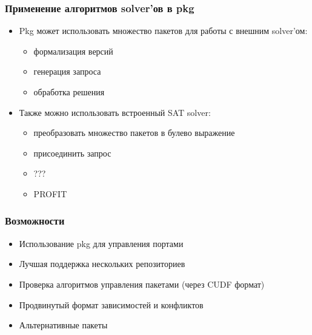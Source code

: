 \documentclass{beamer}
\begin{document}
\begin{frame}
\frametitle{Применение алгоритмов solver'ов в pkg}
\begin{itemize}
  \item Pkg может использовать множество пакетов для работы с внешним solver'ом:
  \begin{itemize}
    \item формализация версий
    \item генерация запроса
    \item обработка решения
  \end{itemize}
  \item Также можно использовать встроенный SAT solver:
  \begin{itemize}
    \item преобразовать множество пакетов в булево выражение
    \item присоединить запрос
    \item ???
    \item PROFIT
  \end{itemize} 
\end{itemize}
\end{frame}

\begin{frame}
\frametitle{Возможности}

\begin{itemize}
  \item Использование pkg для управления портами
  \item Лучшая поддержка нескольких репозиториев
  \item Проверка алгоритмов управления пакетами (через CUDF формат)
  \item Продвинутый формат зависимостей и конфликтов
  \item Альтернативные пакеты
\end{itemize}
\end{frame}
\end{document}
